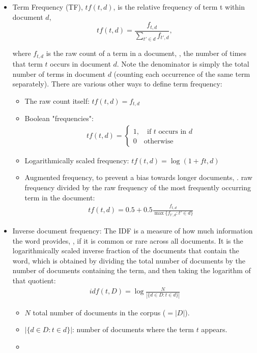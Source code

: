 \begin{itemize}
	\item Term Frequency (TF), $tf(t,d)$, is the relative frequency of term t within document $d$,
		$$tf(t,d) = \frac{f_{t,d}}{\sum_{t'\in d}f_{t',d}},$$

		where $f_{t,d}$ is the raw count of a term in a document, \ie, the number of times that term $t$ occurs in document $d$. Note the denominator is simply the total number of terms in document $d$ (counting each occurrence of the same term separately). There are various other ways to define term frequency:
		\begin{itemize}
			\item The raw count itself: $tf(t,d) = f_{t,d}$ 
    		\item Boolean "frequencies": 
				\begin{align*}
					tf(t,d) = \begin{cases}
						1, \quad \text{if $t$ occurs in $d$}\\
						0 \quad \text{otherwise}
							\end{cases}
				\end{align*}
    		\item Logarithmically scaled frequency: $tf(t,d) = \log (1 + ft,d)$
    		\item Augmented frequency, to prevent a bias towards longer documents, \eg. raw frequency divided by the raw frequency of the most frequently occurring term in the document:
				\begin{align*}
					tf(t,d) = 0.5 + 0.5\frac{f_{t,d}}{\max \{f_{t',d}:t' \in d\}}
				\end{align*}
		\end{itemize}
	\item Inverse document frequency: The IDF is a measure of how much information the word provides, \ie, if it is common or rare across all documents. It is the logarithmically scaled inverse fraction of the documents that contain the word, which is obtained by dividing the total number of documents by the number of documents containing the term, and then taking the logarithm of that quotient: 
		\begin{align*}
			idf(t, D) = \log \frac{N}{|\{d\in D: t\in d\}|}
		\end{align*}
		\begin{itemize}
			\item $N$ total number of documents in the corpus ($=|D|$). 
			\item $|\{d\in D: t\in d\}|$: number of documents where the term $t$ appears.
			\item 
		\end{itemize}

\end{itemize}













